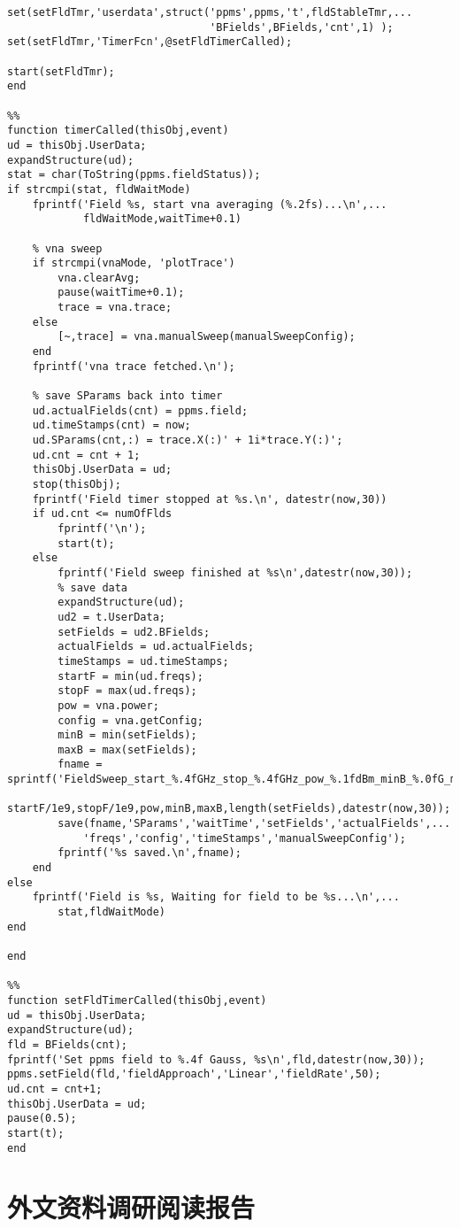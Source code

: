 \begin{lstlisting}
set(setFldTmr,'userdata',struct('ppms',ppms,'t',fldStableTmr,...
                                'BFields',BFields,'cnt',1) );
set(setFldTmr,'TimerFcn',@setFldTimerCalled);

start(setFldTmr);
end

%%
function timerCalled(thisObj,event)
ud = thisObj.UserData;
expandStructure(ud);
stat = char(ToString(ppms.fieldStatus));
if strcmpi(stat, fldWaitMode)
    fprintf('Field %s, start vna averaging (%.2fs)...\n',...
            fldWaitMode,waitTime+0.1)
    
    % vna sweep
    if strcmpi(vnaMode, 'plotTrace')
        vna.clearAvg;
        pause(waitTime+0.1);
        trace = vna.trace;
    else
        [~,trace] = vna.manualSweep(manualSweepConfig);
    end
    fprintf('vna trace fetched.\n');
    
    % save SParams back into timer
    ud.actualFields(cnt) = ppms.field;
    ud.timeStamps(cnt) = now;
    ud.SParams(cnt,:) = trace.X(:)' + 1i*trace.Y(:)';
    ud.cnt = cnt + 1;
    thisObj.UserData = ud;
    stop(thisObj);
    fprintf('Field timer stopped at %s.\n', datestr(now,30))
    if ud.cnt <= numOfFlds
        fprintf('\n');
        start(t);
    else
        fprintf('Field sweep finished at %s\n',datestr(now,30));
        % save data
        expandStructure(ud);
        ud2 = t.UserData;
        setFields = ud2.BFields;
        actualFields = ud.actualFields;
        timeStamps = ud.timeStamps;
        startF = min(ud.freqs);
        stopF = max(ud.freqs);
        pow = vna.power;
        config = vna.getConfig;
        minB = min(setFields);
        maxB = max(setFields);
        fname = sprintf('FieldSweep_start_%.4fGHz_stop_%.4fGHz_pow_%.1fdBm_minB_%.0fG_maxB_%.0fG_numB_%d_%s.mat',...
            startF/1e9,stopF/1e9,pow,minB,maxB,length(setFields),datestr(now,30));
        save(fname,'SParams','waitTime','setFields','actualFields',...
            'freqs','config','timeStamps','manualSweepConfig');
        fprintf('%s saved.\n',fname);
    end
else
    fprintf('Field is %s, Waiting for field to be %s...\n',...
        stat,fldWaitMode)
end

end

%%
function setFldTimerCalled(thisObj,event)
ud = thisObj.UserData;
expandStructure(ud);
fld = BFields(cnt);
fprintf('Set ppms field to %.4f Gauss, %s\n',fld,datestr(now,30));
ppms.setField(fld,'fieldApproach','Linear','fieldRate',50);
ud.cnt = cnt+1;
thisObj.UserData = ud;
pause(0.5);
start(t);
end
  \end{lstlisting}
  



\chapter{外文资料调研阅读报告}




